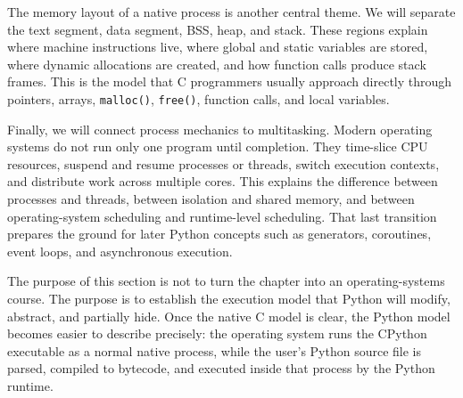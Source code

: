 The memory layout of a native process is another central theme. We will separate the text segment, data segment, BSS, heap, and stack. These regions explain where machine instructions live, where global and static variables are stored, where dynamic allocations are created, and how function calls produce stack frames. This is the model that C programmers usually approach directly through pointers, arrays, \texttt{malloc()}, \texttt{free()}, function calls, and local variables.

Finally, we will connect process mechanics to multitasking. Modern operating systems do not run only one program until completion. They time-slice CPU resources, suspend and resume processes or threads, switch execution contexts, and distribute work across multiple cores. This explains the difference between processes and threads, between isolation and shared memory, and between operating-system scheduling and runtime-level scheduling. That last transition prepares the ground for later Python concepts such as generators, coroutines, event loops, and asynchronous execution.

The purpose of this section is not to turn the chapter into an operating-systems course. The purpose is to establish the execution model that Python will modify, abstract, and partially hide. Once the native C model is clear, the Python model becomes easier to describe precisely: the operating system runs the CPython executable as a normal native process, while the user's Python source file is parsed, compiled to bytecode, and executed inside that process by the Python runtime.
